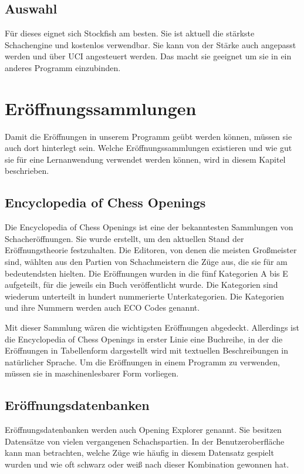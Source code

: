 \subsection{Auswahl}
Für dieses eignet sich Stockfish am besten. Sie ist aktuell die stärkste Schachengine und kostenlos verwendbar. Sie kann von der Stärke auch angepasst werden und über \ac{UCI} angesteuert werden. Das macht sie geeignet um sie in ein anderes Programm einzubinden.

\section{Eröffnungssammlungen}
Damit die Eröffnungen in unserem Programm geübt werden können, müssen sie auch dort hinterlegt sein. Welche Eröffnungssammlungen existieren und wie gut sie für eine Lernanwendung verwendet werden können, wird in diesem Kapitel beschrieben.

\subsection{Encyclopedia of Chess Openings}
Die Encyclopedia of Chess Openings ist eine der bekanntesten Sammlungen von Schacheröffnungen. Sie wurde erstellt, um den aktuellen Stand der Eröffnungstheorie festzuhalten.
Die Editoren, von denen die meisten Großmeister sind, wählten aus den Partien von Schachmeistern die Züge aus, die sie für am bedeutendsten hielten. Die Eröffnungen wurden in die fünf Kategorien A bis E aufgeteilt, für die jeweils ein Buch veröffentlicht wurde. Die Kategorien sind wiederum unterteilt in hundert nummerierte Unterkategorien. Die Kategorien und ihre Nummern werden auch ECO Codes genannt.
\cite{wikipedia_foundation_inc_encyclopaedia_2024}

Mit dieser Sammlung wären die wichtigsten Eröffnungen abgedeckt. Allerdings ist die Encyclopedia of Chess Openings in erster Linie eine Buchreihe, in der die Eröffnungen in Tabellenform dargestellt wird mit textuellen Beschreibungen in natürlicher Sprache. Um die Eröffnungen in einem Programm zu verwenden, müssen sie in maschinenlesbarer Form vorliegen.

\subsection{Eröffnungsdatenbanken}
Eröffnungsdatenbanken werden auch Opening Explorer genannt. Sie besitzen Datensätze von vielen vergangenen Schachspartien. In der Benutzeroberfläche kann man betrachten, welche Züge wie häufig in diesem Datensatz gespielt wurden und wie oft schwarz oder weiß nach dieser Kombination gewonnen hat. 


